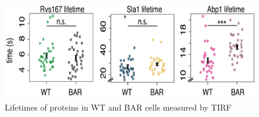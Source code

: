 \begin{figure}[H]
	\vspace{2cm}
	\hspace{0.1cm}
	\includegraphics[scale=0.5]{figures/appendix/delsh3_5}
	\caption{     Lifetimes of proteins in WT and BAR cells measured by TIRF}
\end{figure}